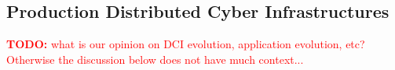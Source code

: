 \documentclass{article}
\newcommand{\B}[1]{\textbf{#1}}
\newcommand{\todo}[1]{{\textcolor{red}{\B{TODO:} #1 }}}
\newcommand{\alnote}[1]{{\textcolor{blue}{    \B{AndreL:  } #1 }}}
\newcommand{\ownote}[1]{{\textcolor{Brown}{   \B{Ole:     } #1 }}}
\newcommand{\todo}[1]{}
\newcommand{\alnote}[1]{}
\newcommand{\ownote}[1]{}
\begin{document}
 \subsection{Production Distributed Cyber Infrastructures}



  \todo{what is our opinion on DCI evolution, application evolution, etc?
  Otherwise the discussion below does not have much context...}
\end{document}
